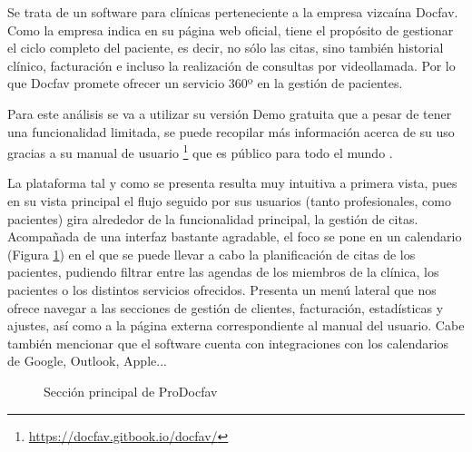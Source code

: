 Se trata de un software para clínicas perteneciente a la empresa vizcaína Docfav. Como la empresa indica en su página web oficial, tiene el propósito de gestionar el ciclo completo del paciente, es decir, no sólo las citas, sino también historial clínico, facturación e incluso la realización de consultas por videollamada. Por lo que Docfav promete ofrecer un servicio 360º en la gestión de pacientes. \bigskip

Para este análisis se va a utilizar su versión Demo gratuita que a pesar de tener una funcionalidad limitada, se puede recopilar más información acerca de su uso gracias a su manual de usuario \footnote{\url{ https://docfav.gitbook.io/docfav/}} que es público para todo el mundo . \bigskip

La plataforma tal y como se presenta resulta muy intuitiva a primera vista, pues en su vista principal el flujo seguido por sus usuarios (tanto profesionales, como pacientes) gira alrededor de la funcionalidad principal, la gestión de citas. Acompañada de una interfaz bastante agradable, el foco se pone en un calendario (Figura \ref{fig:docfav-calendario}) en el que se puede llevar a cabo la planificación de citas de los pacientes, pudiendo filtrar entre las agendas de los miembros de la clínica, los pacientes o los distintos servicios ofrecidos. Presenta un menú lateral que nos ofrece navegar a las secciones de gestión de clientes, facturación, estadísticas y ajustes, así como a la página externa correspondiente al manual del usuario. Cabe también mencionar que el software cuenta con integraciones con los calendarios de Google, Outlook, Apple... \bigskip

\begin{figure}[H]
    \caption{Sección principal de ProDocfav}
    \label{fig:docfav-calendario}
\end{figure}

